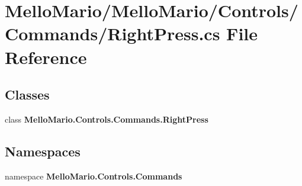 \section{Mello\+Mario/\+Mello\+Mario/\+Controls/\+Commands/\+Right\+Press.cs File Reference}
\label{RightPress_8cs}
\subsection*{Classes}
\begin{DoxyCompactItemize}
\item 
class \textbf{ Mello\+Mario.\+Controls.\+Commands.\+Right\+Press}
\end{DoxyCompactItemize}
\subsection*{Namespaces}
\begin{DoxyCompactItemize}
\item 
namespace \textbf{ Mello\+Mario.\+Controls.\+Commands}
\end{DoxyCompactItemize}
